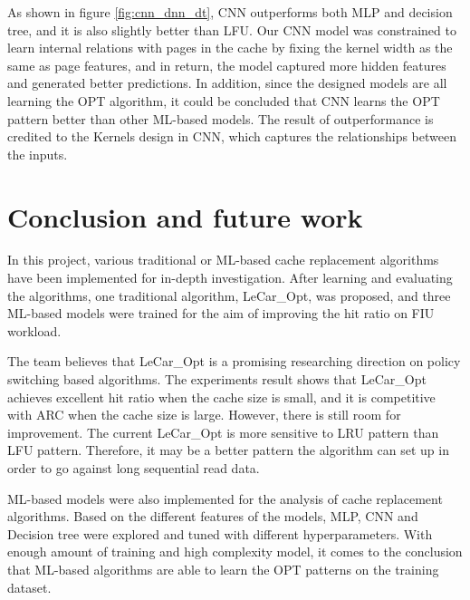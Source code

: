 \documentclass[letterpaper,twocolumn,10pt]{article}
\begin{document}
As shown in figure \ref{fig:cnn_dnn_dt}, CNN outperforms both MLP and decision tree, and it is also slightly better than LFU. Our CNN model was constrained to learn internal relations with pages in the cache by fixing the kernel width as the same as page features, and in return, the model captured more hidden features and generated better predictions. In addition, since the designed models are all learning the OPT algorithm, it could be concluded that CNN learns the OPT pattern better than other ML-based models.  The result of outperformance is credited to the Kernels\cite{schmidhuber2015deep} design in CNN, which captures the relationships between the inputs.  


\section{Conclusion and future work}


In this project, various traditional or ML-based cache replacement algorithms have been implemented for in-depth investigation. After learning and evaluating the algorithms, one traditional algorithm, LeCar\_Opt, was proposed,  and three ML-based models were trained for the aim of improving the hit ratio on FIU workload. 

The team believes that LeCar\_Opt is a promising researching direction on policy switching based algorithms. The experiments result shows that LeCar\_Opt achieves excellent hit ratio when the cache size is small, and it is competitive with ARC when the cache size is large. However, there is still room for improvement. The current LeCar\_Opt is more sensitive to LRU pattern than LFU pattern. Therefore, it may be a better pattern the algorithm can set up in order to go against long sequential read data. 

ML-based models were also implemented for the analysis of cache replacement algorithms. Based on the different features of the models, MLP, CNN and Decision tree were explored and tuned with different hyperparameters. With enough amount of training and high complexity model,  it comes to the conclusion that ML-based algorithms are able to learn the OPT patterns on the training dataset. 














\end{document}

